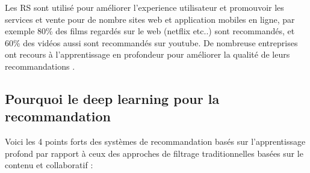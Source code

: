 \par Les RS sont utilisé pour améliorer l'experience utilisateur et promouvoir les services et vente pour de nombre sites web et application mobiles en ligne, par exemple 80\% des films regardés sur le web (netflix etc..) sont recommandés, et 60\% des vidéos aussi sont recommandés sur youtube. De nombreuse entreprises ont recours à l'apprentissage en profondeur pour améliorer la qualité de leurs recommandations \cite{ch2ref2}.

    \subsection{Pourquoi le deep learning pour la recommandation }
    Voici les 4 points forts des systèmes de recommandation basés sur l'apprentissage profond par rapport à ceux des approches de filtrage traditionnelles basées sur le contenu et collaboratif : \cite{ch2ref23}
    
